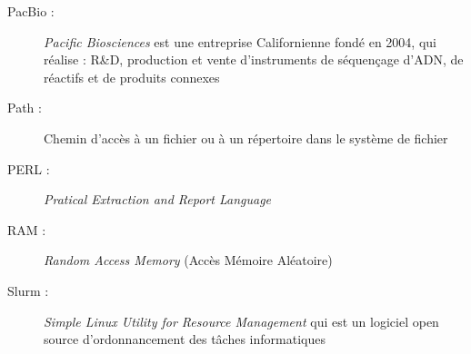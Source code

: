 \begin{description}
    \item[PacBio :] \emph{Pacific Biosciences} est une entreprise Californienne fondé en 2004, qui réalise : R\&D, production et vente d’instruments de séquençage d’ADN, de réactifs et de produits connexes
    \item[Path : ] Chemin d'accès à un fichier ou à un répertoire dans le système de fichier
    \item[PERL :] \emph{Pratical Extraction and Report Language}
    \item[RAM :] \emph{Random Access Memory} (Accès Mémoire Aléatoire)
    \item[Slurm :] \emph{Simple Linux Utility for Resource Management} qui est un logiciel open source d'ordonnancement des tâches informatiques
\end{description}